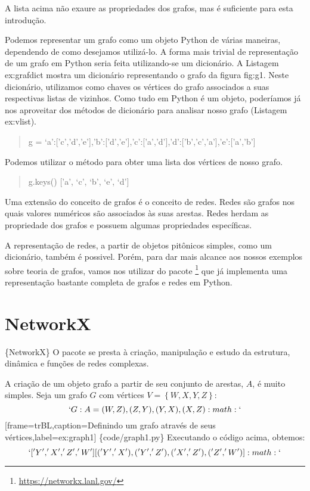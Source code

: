 \documentclass[a4paper,10pt,portuguese]{sphinxmanual}
\begin{document}
A lista acima não exaure as propriedades dos grafos, mas é
suficiente para esta introdução.

Podemos representar um grafo como um objeto Python de várias
maneiras, dependendo de como desejamos utilizá-lo. A forma mais
trivial de representação de um grafo em Python seria feita
utilizando-se um dicionário. A Listagem ex:grafdict mostra um
dicionário representando o grafo da figura fig:g1. Neste
dicionário, utilizamos como chaves os vértices do grafo associados
a suas respectivas listas de vizinhos. Como tudo em Python é um
objeto, poderíamos já nos aproveitar dos métodos de dicionário para
analisar nosso grafo (Listagem ex:vlist).
\begin{quote}

g =
`a':{[}'c','d','e'{]},'b':{[}'d','e'{]},'c':{[}'a','d'{]},'d':{[}'b','c','a'{]},'e':{[}'a','b'{]}
\end{quote}

Podemos utilizar o método  para obter uma lista dos
vértices de nosso grafo.
\begin{quote}

g.keys() {[}'a', `c', `b', `e', `d'{]}
\end{quote}

Uma extensão do conceito de grafos é o conceito de redes. Redes são
grafos nos quais valores numéricos são associados às suas arestas.
Redes herdam as propriedade dos grafos e possuem algumas
propriedades específicas.

A representação de redes, a partir de objetos pitônicos simples,
como um dicionário, também é possivel. Porém, para dar mais alcance
aos nossos exemplos sobre teoria de grafos, vamos nos utilizar do
pacote  \footnote{
\href{https://networkx.lanl.gov/}{https://networkx.lanl.gov/}
} que já implementa uma representação
bastante completa de grafos e redes em Python.


\chapter{NetworkX}
\label{capgraph:networkx}
\{NetworkX\} O pacote  se presta à criação, manipulação e
estudo da estrutura, dinâmica e funções de redes complexas.

A criação de um objeto grafo a partir de seu conjunto de arestas,
$A$, é muito simples. Seja um grafo $G$ com
vértices $V=\left\lbrace W,X,Y,Z\right\rbrace $:
$$`G:A= (W,Z),(Z,Y),(Y,X),(X,Z) :math:`$$
{[}frame=trBL,caption=Definindo um grafo através de seus vértices,label=ex:graph1{]} \{code/graph1.py\}
Executando o código acima, obtemos: $$`['Y', 'X', 'Z', 'W']
[('Y', 'X'), ('Y', 'Z'), ('X', 'Z'), ('Z', 'W')]:math:`$$
\end{document}
